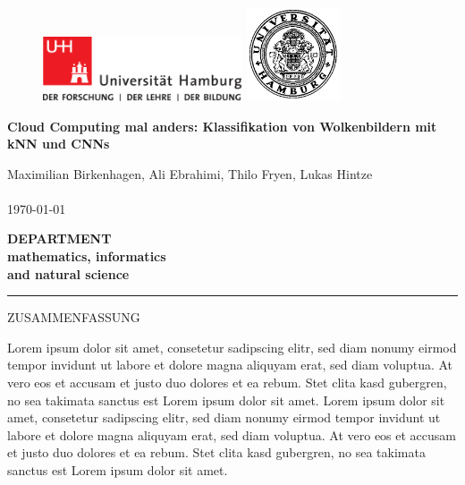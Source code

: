 \documentclass[a4,german]{article}
\begin{document}
\begin{titlepage}
\begin{figure}[h]
	\begin{minipage}[b]{62mm}
		\includegraphics[width=59mm]{unilogo.png}
	\end{minipage}
	\hspace{4cm}
	\begin{minipage}[b]{59mm}
            	\includegraphics[width=28mm]{unihh.png}
	\end{minipage}
\end{figure}

\vfill
	
\begin{center}
\vspace{14mm}
\noindent \textbf{\huge Cloud Computing mal anders: Klassifikation von Wolkenbildern mit kNN und CNNs\\ %
}
\vspace{4mm}
\vfill

 Maximilian Birkenhagen, Ali Ebrahimi, Thilo Fryen, Lukas Hintze \\
~ \\
\today

\vspace{15mm}
\textbf{ \Large{DEPARTMENT} \\ \small{mathematics, informatics \\ and natural science} \\ }	
\vspace{5mm}
\noindent \rule{\textwidth}{0.4mm} %

\Large{ZUSAMMENFASSUNG}
\end{center}
\noindent Lorem ipsum dolor sit amet, consetetur sadipscing elitr, sed diam nonumy eirmod tempor invidunt ut labore et dolore magna aliquyam erat, sed diam voluptua. At vero eos et accusam et justo duo dolores et ea rebum. Stet clita kasd gubergren, no sea takimata sanctus est Lorem ipsum dolor sit amet. Lorem ipsum dolor sit amet, consetetur sadipscing elitr, sed diam nonumy eirmod tempor invidunt ut labore et dolore magna aliquyam erat, sed diam voluptua. At vero eos et accusam et justo duo dolores et ea rebum. Stet clita kasd gubergren, no sea takimata sanctus est Lorem ipsum dolor sit amet.\\
\end{titlepage}
\end{document}
